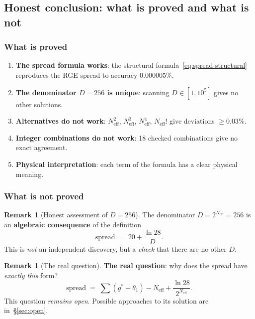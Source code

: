 \documentclass[11pt,a4paper]{article}
\theoremstyle{definition}
\newtheorem{remark}[theorem]{Remark}
\begin{document}
\subsection{Honest conclusion: what is proved and what is not}
\label{subsec:spread-honest}

\subsubsection{What is proved}

\begin{enumerate}
    \item \textbf{The spread formula works}: the structural
          formula~\eqref{eq:spread-structural} reproduces
          the RGE spread to accuracy $\mathbf{0.000005\%}$.
    \item \textbf{The denominator $D = 256$ is unique}: scanning
          $D \in [1, 10^5]$ gives no other solutions.
    \item \textbf{Alternatives do not work}: $N_{\text{eff}}^2$,
          $N_{\text{eff}}^3$, $N_{\text{eff}}^4$, $N_{\text{eff}}!$
          give deviations $\geq 0.03\%$.
    \item \textbf{Integer combinations do not work}: 18 checked
          combinations give no exact agreement.
    \item \textbf{Physical interpretation}: each term of the
          formula has a clear physical meaning.
\end{enumerate}

\subsubsection{What is not proved}

\begin{remark}[Honest assessment of $D = 256$]
\label{rem:honest-256}
The denominator $D = 2^{N_{\text{eff}}} = 256$ is an
\textbf{algebraic consequence} of the definition
\begin{equation}
    \text{spread} \;=\; 20 + \frac{\ln 28}{D}.
\end{equation}
This is \emph{not} an independent discovery, but a \emph{check} that
there are no other $D$.
\end{remark}

\begin{remark}[The real question]
\label{rem:real-question}
\textbf{The real question}: why does the spread have \emph{exactly
this} form?
\begin{equation}
    \text{spread} \;=\; \sum(g^* + \theta_1) - N_{\text{eff}}
    + \frac{\ln 28}{2^{N_{\text{eff}}}}.
\end{equation}
This question \emph{remains open}. Possible approaches
to its solution are in~\S\ref{sec:open}.
\end{remark}
\end{document}
